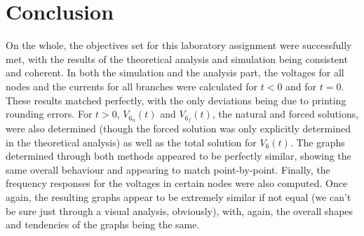 
\section{Conclusion}
\label{sec:conclusion}

On the whole, the objectives set for this laboratory assignment were successfully met, with the results of the theoretical analysis and simulation being consistent and coherent.
In both the simulation and the analysis part, the voltages for all nodes and the currents for all branches were calculated for $t<0$ and for $t=0$. These results matched perfectly, with the only deviations being due to printing rounding errors.
For $t>0$, $V_{6_n}(t)$ and $V_{6_f}(t)$, the natural and forced solutions, were also determined (though the forced solution was only explicitly determined in the theoretical analysis) as well as the total solution for $V_6(t)$. The graphs determined through both methods appeared to be perfectly similar, showing the same overall behaviour and appearing to match point-by-point.
Finally, the frequency responses for the voltages in certain nodes were also computed. Once again, the resulting graphs appear to be extremely similar if not equal (we can't be sure just through a visual analysis, obviously), with, again, the overall shapes and tendencies of the graphs being the same.




